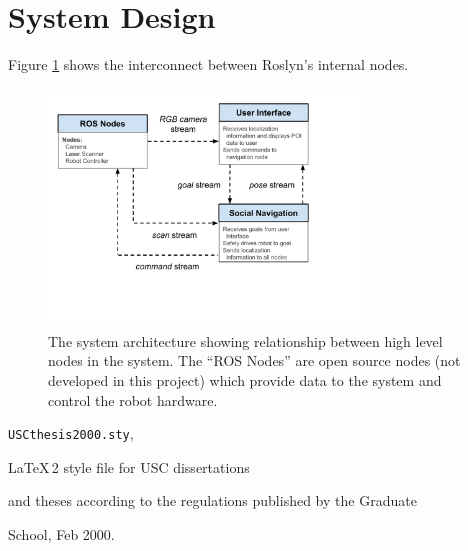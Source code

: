 \documentclass[11pt]{report}
\begin{document}
\section{System Design}
Figure \ref{figure:nodes} shows the interconnect between Roslyn's internal nodes.
\begin{figure}[Node Graph]
 \caption{The system architecture showing relationship between high level nodes in the system. The “ROS Nodes” are open source nodes (not developed in this project) which provide data to the system and control the robot hardware.}
 \label{figure:nodes}
 \includegraphics[width=0.75\textwidth]{Nodes.pdf}
\end{figure}


\begin{thebibliography}{99}

  \verb=USCthesis2000.sty=,

 \LaTeX\,2\raisebox{-0.2ex}{$\varepsilon$} style file for USC dissertations

 and theses according to the regulations published by the Graduate

 School, Feb 2000.

\end{thebibliography}
\end{document}
